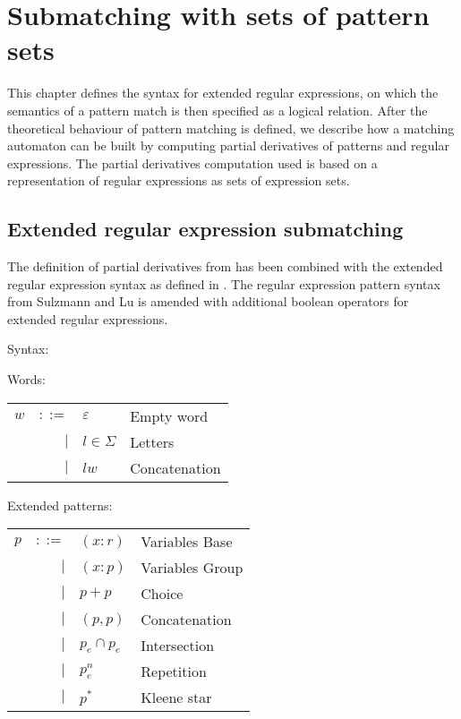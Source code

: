 \chapter{Submatching with sets of pattern sets}
\label{submatching}

This chapter defines the syntax for extended regular expressions, on which the
semantics of a pattern match is then specified as a logical relation.  After the
theoretical behaviour of pattern matching is defined, we describe how a matching
automaton can be built by computing partial derivatives of patterns and regular
expressions. The partial derivatives computation used is based on a
representation of regular expressions as sets of expression sets.


\section{Extended regular expression submatching}
\label{ere-submatch}

The definition of partial derivatives from \cite{pdpat} has been combined with
the extended regular expression syntax as defined in \cite{pdere}. The regular
expression pattern syntax from Sulzmann and Lu is amended with additional
boolean operators for extended regular expressions.

\begin{defn}
   \label{defn-syn}
   Syntax:

   Words:

   \begin{tabular}{lrll}
      $w$	& $::=$	& $\varepsilon$		& Empty word	\\
		& $|$	& $l \in \Sigma$	& Letters	\\
		& $|$	& $lw$			& Concatenation	\\
   \end{tabular}

   \needspace{3cm}
   Extended patterns:

   \begin{tabular}{lrll}
      $p$	& $::=$	& $(x:r)$			& Variables Base	\\
		& $|$	& $(x:p)$			& Variables Group	\\
		& $|$	& $p+p$				& Choice		\\
		& $|$	& $(p,p)$			& Concatenation		\\
		& $|$	& $p_e \cap p_e$		& Intersection		\\
        	& $|$	& $p_e^n$			& Repetition		\\
		& $|$	& $p^*$				& Kleene star		\\
   \end{tabular}
\end{defn}


